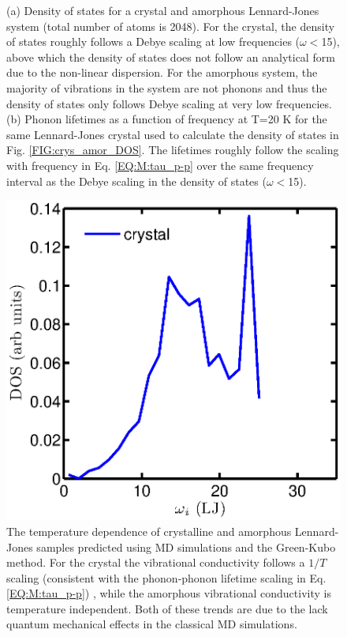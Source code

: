 \documentclass[letterpaper,12pt]{article}
\begin{document}
\begin{figure}[ht]
{\label{FIG:phonon_life_scaling}
}
\label{FIG:crys_dos_life}
\caption{ (a) Density of states for a crystal and amorphous Lennard-Jones system (total number of atoms is 2048). For the crystal, the density of states roughly follows a Debye scaling at low frequencies ($\omega<$15), above which the density of states does not follow an analytical form due to the non-linear dispersion. For the amorphous system, the majority of vibrations in the system are not phonons and thus the density of states only follows Debye scaling at very low frequencies. (b) Phonon lifetimes as a function of frequency at T=20 K for the same Lennard-Jones crystal used to calculate the density of states in Fig. \ref{FIG:crys_amor_DOS}. The lifetimes roughly follow the scaling with frequency in Eq. \eqref{EQ:M:tau_p-p} over the same frequency interval as the Debye scaling in the density of states ($\omega<$15).}
\end{figure}

\begin{figure}
\begin{center}
\includegraphics[scale=0.5]{LJAr_crys_DOS.eps}
\vspace*{-5mm}
\end{center}
\caption{\label{FIG:LJ_amor_GK}The temperature dependence of crystalline and amorphous Lennard-Jones samples predicted using MD simulations and the Green-Kubo method.\cite{mcgaughey2004a} For the crystal the vibrational conductivity follows a $1/T$ scaling (consistent with the phonon-phonon lifetime scaling in Eq$.$ \eqref{EQ:M:tau_p-p}) , while the amorphous vibrational conductivity is temperature independent. Both of these trends are due to the lack quantum mechanical effects in the classical MD simulations. }
\end{figure}
\end{document}
